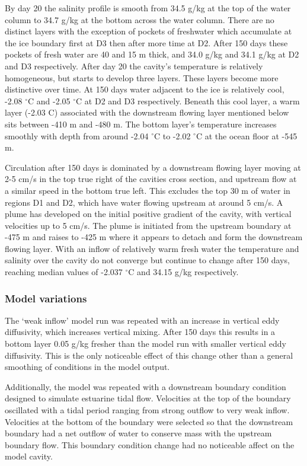 By day 20 the salinity profile is smooth from 34.5  g/kg at the top of the water column to 34.7 g/kg at the bottom across the water column. There are no distinct layers with the exception of pockets of freshwater which accumulate at the ice boundary first at D3 then after more time at D2. After 150 days these pockets of fresh water are 40 and 15 m thick, and 34.0 g/kg and 34.1 g/kg at D2 and D3 respectively. After day 20 the cavity's temperature is relatively homogeneous, but starts to develop three layers. These layers become more distinctive over time. At 150 days water adjacent to the ice is relatively cool, -2.08 $^{\circ}$C and -2.05 $^{\circ}$C at D2 and D3 respectively. Beneath this cool layer, a warm layer (-2.03 \textdegree C) associated with the downstream flowing layer mentioned below sits between -410 m and -480 m. The bottom layer's temperature increases smoothly with depth from around -2.04 $^{\circ}$C to -2.02 $^{\circ}$C at the ocean floor at -545 m.  

Circulation after 150 days is dominated by a downstream flowing layer moving at 2-5 cm/s in the top true right of the cavities cross section, and upstream flow at a similar speed in the bottom true left.  This excludes the top 30 m of water in regions D1 and D2, which have water flowing upstream at around 5 cm/s. 
A plume has developed on the initial positive gradient of the cavity, with vertical velocities up to 5 cm/s. The plume is initiated from the upstream boundary at -475 m and raises to -425 m where it appears to detach and form the downstream flowing layer.
With an inflow of relatively warm fresh  water the temperature and salinity over the cavity do not converge but continue to change after 150 days, reaching median values of -2.037 $^{\circ}$C and 34.15 g/kg respectively.

\subsubsection{Model variations}
The `weak inflow' model run was repeated with an increase in vertical eddy diffusivity, which increases vertical mixing. After 150 days this results in a bottom layer 0.05  g/kg fresher than the model run with smaller vertical eddy diffusivity. This is the only noticeable effect of this change other than a general smoothing of conditions in the model output. 

Additionally, the model was repeated with a downstream boundary condition designed to simulate estuarine tidal flow. Velocities at the top of the boundary oscillated with a tidal period ranging from strong outflow to very weak inflow. Velocities at the bottom of the boundary were selected so that the downstream boundary had a net outflow of water to conserve mass with the upstream boundary flow. This boundary condition change had no noticeable affect on the model cavity.

